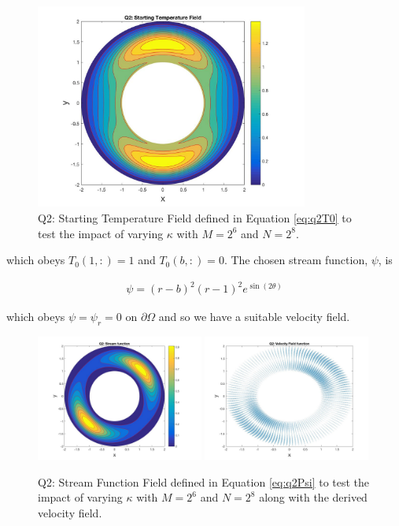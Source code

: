 \documentclass{article}
\begin{document}
	\begin{figure}[h!]
		\centering
		\includegraphics[width = 0.8\textwidth]{fig_q2KappaStart}
		\caption{Q2: Starting Temperature Field defined in Equation \ref{eq:q2T0} to test the impact of varying $\kappa$ with $M = 2^6$ and $N=2^8$.}
		\label{fig:q2KappaStart}
	\end{figure}

which obeys $T_0(1,:) = 1$ and $T_0(b,:) = 0$. The chosen stream function, $\psi$, is 

\begin{align}
	 \psi = (r - b)^2 (r - 1)^2  e^{ \sin(2 \theta) }
	 \label{eq:q2Psi}
\end{align}

which obeys $\psi = \psi_r = 0$ on $\partial \Omega$ and so we have a suitable velocity field.

	\begin{figure}[h!]
		\centering
		\includegraphics[width = 0.49\textwidth]{fig_q2psi}
		\includegraphics[width = 0.49\textwidth]{fig_q2ufield}
		\caption{Q2: Stream Function Field defined in Equation \ref{eq:q2Psi} to test the impact of varying $\kappa$ with $M = 2^6$ and $N=2^8$ along with the derived velocity field.}
		\label{fig:q2KappaPsi}
	\end{figure}
\end{document}
